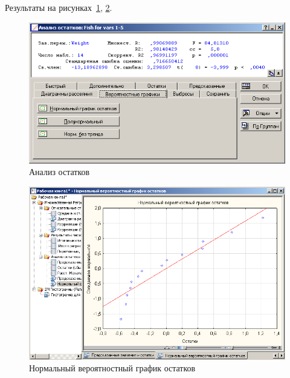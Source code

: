 Результаты на рисунках~\ref{fig:var5__35}, \ref{fig:var5__36}.

\begin{figure}[!h]
  \centering

  \includegraphics[width=16cm]
  {inc/var5__35.PNG}

  \caption{Анализ остатков}

  \label{fig:var5__35}
\end{figure}

\begin{figure}[!h]
  \centering

  \includegraphics[width=16cm]
  {inc/var5__36.PNG}

  \caption{Нормальный вероятностный график остатков}

  \label{fig:var5__36}
\end{figure}
